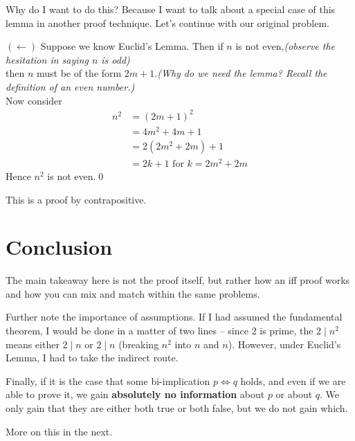 Why do I want to do this? Because I want to talk about a special case of this lemma in another proof technique. Let's continue with our original problem.
\begin{smrg}
$(\leftarrow)$ Suppose we know Euclid's Lemma. Then if $n$ is not even,\hfill{\footnotesize\itshape(observe the hesitation in saying $n$ is odd)}\\
then $n$ must be of the form $2m + 1$.\hfill{\footnotesize\itshape(Why do we need the lemma? Recall the definition of an even number.)}\\

Now consider
\begin{align*}
n^2 &= (2m + 1)^2 \\
&= 4m^2 + 4m + 1 \\
&= 2(2m^2 + 2m) + 1 \\
&= 2k + 1 \text{ for } k = 2m^2 + 2m
\end{align*}
Hence $n^2$ is not even.\qed
\end{smrg}
This is a proof by contrapositive.
\section*{Conclusion}
The main takeaway here is not the proof itself, but rather how an iff proof works and how you can mix and match within the same problems.

Further note the importance of assumptions. If I had assumed the fundamental theorem, I would be done in a matter of two lines -- since $2$ is prime, the $2\mid n^2$ means either $2\mid n$ or $2\mid n$  (breaking $n^2$ into $n$ and $n$). However, under Euclid's Lemma, I had to take the indirect route.

Finally, if it is the case that some bi-implication $p \iff q$ holds, and even if we are able to prove it, we gain \textbf{absolutely no information} about $p$ or about $q$. We only gain that they are either both true or both false, but we do not gain which.

More on this in the next.
